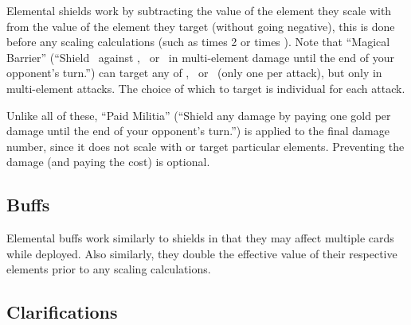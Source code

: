 \documentclass[dvipsnames,parskip,a4paper]{scrartcl}
\newcommand{\iconsize}{3.4mm}
\newcommand{\icondepth}{0.45mm}
\newcommand{\icon}[1]{\raisebox{-\icondepth}{\texttt{[image:  \#1 ]}}}
\newcommand{\fire}{\icon{icons/fire.png}}
\newcommand{\earth}{\icon{icons/earth.png}}
\newcommand{\water}{\icon{icons/water.png}}
\newcommand{\magic}{\icon{icons/magic.png}}
\begin{document}
Elemental shields work by subtracting the value of the element they scale with from the value of the element they target (without going negative), this is done before any scaling calculations (such as times 2 or times \magic). Note that ``Magical Barrier'' (``Shield \magic \ against \fire, \earth \ or \water \ in multi-element damage until the end of your opponent's turn.'') can target any of \fire, \earth \ or \water \ (only one per attack), but only in multi-element attacks. The choice of which to target is individual for each attack.

Unlike all of these, ``Paid Militia'' (``Shield any damage by paying one gold per damage until the end of your opponent's turn.'') is applied to the final damage number, since it does not scale with or target particular elements. Preventing the damage (and paying the cost) is optional.

\subsection*{Buffs}

Elemental buffs work similarly to shields in that they may affect multiple cards while deployed. Also similarly, they double the effective value of their respective elements prior to any scaling calculations.

\subsection*{Clarifications}
\end{document}
